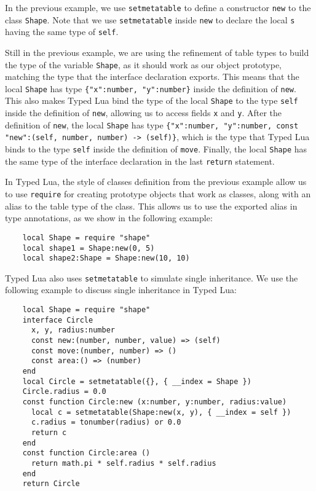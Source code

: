 In the previous example, we use \texttt{setmetatable} to define a constructor
\texttt{new} to the class \texttt{Shape}.
Note that we use \texttt{setmetatable} inside \texttt{new} to declare
the local \texttt{s} having the same type of \texttt{self}.

Still in the previous example, we are using the refinement of table
types to build the type of the variable \texttt{Shape},
as it should work as our object prototype, matching the type
that the interface declaration exports.
This means that the local \texttt{Shape} has type
\texttt{\{"x":number, "y":number\}} inside the definition of \texttt{new}.
This also makes Typed Lua bind the type of the local \texttt{Shape}
to the type \texttt{self} inside the definition of \texttt{new},
allowing us to access fields \texttt{x} and \texttt{y}.
After the definition of \texttt{new}, the local \texttt{Shape}
has type
\texttt{\{"x":number, "y":number, const "new":(self, number, number) -> (self)\}},
which is the type that Typed Lua binds to the type \texttt{self}
inside the definition of \texttt{move}.
Finally, the local \texttt{Shape} has the same type of the
interface declaration in the last \texttt{return} statement.

In Typed Lua, the style of classes definition from the previous example
allow us to use \texttt{require} for creating prototype objects that
work as classes, along with an alias to the table type of the class.
This allows us to use the exported alias in type annotations,
as we show in the following example:
\begin{verbatim}
    local Shape = require "shape"
    local shape1 = Shape:new(0, 5)
    local shape2:Shape = Shape:new(10, 10)
\end{verbatim}

Typed Lua also uses \texttt{setmetatable} to simulate single inheritance.
We use the following example to discuss single inheritance in Typed Lua:
\begin{verbatim}
    local Shape = require "shape"
    interface Circle
      x, y, radius:number
      const new:(number, number, value) => (self)
      const move:(number, number) => ()
      const area:() => (number)
    end
    local Circle = setmetatable({}, { __index = Shape })
    Circle.radius = 0.0
    const function Circle:new (x:number, y:number, radius:value)
      local c = setmetatable(Shape:new(x, y), { __index = self })
      c.radius = tonumber(radius) or 0.0
      return c
    end
    const function Circle:area ()
      return math.pi * self.radius * self.radius
    end
    return Circle
\end{verbatim}

